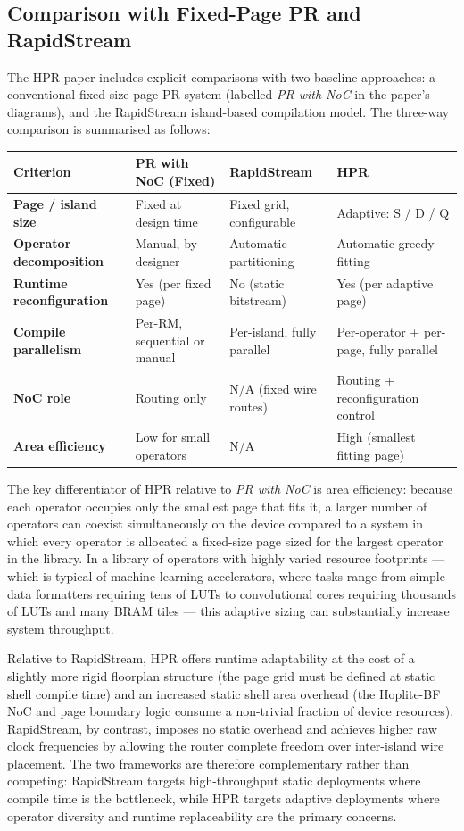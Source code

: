 \subsection{Comparison with Fixed-Page PR and RapidStream}

The HPR paper includes explicit comparisons with two baseline approaches: a conventional fixed-size page PR system (labelled \textit{PR with NoC} in the paper's diagrams), and the RapidStream island-based compilation model. The three-way comparison is summarised as follows:

\begin{table}[htbp]
\centering
\begin{tabular}{llll}
\toprule
Criterion & PR with NoC (Fixed) & RapidStream & HPR \\
\midrule
\textbf{Page / island size} & Fixed at design time & Fixed grid, configurable & Adaptive: S / D / Q \\
\textbf{Operator decomposition} & Manual, by designer & Automatic partitioning & Automatic greedy fitting \\
\textbf{Runtime reconfiguration} & Yes (per fixed page) & No (static bitstream) & Yes (per adaptive page) \\
\textbf{Compile parallelism} & Per-RM, sequential or manual & Per-island, fully parallel & Per-operator + per-page, fully parallel \\
\textbf{NoC role} & Routing only & N/A (fixed wire routes) & Routing + reconfiguration control \\
\textbf{Area efficiency} & Low for small operators & N/A & High (smallest fitting page) \\
\bottomrule
\end{tabular}
\end{table}

The key differentiator of HPR relative to \textit{PR with NoC} is area efficiency: because each operator occupies only the smallest page that fits it, a larger number of operators can coexist simultaneously on the device compared to a system in which every operator is allocated a fixed-size page sized for the largest operator in the library. In a library of operators with highly varied resource footprints — which is typical of machine learning accelerators, where tasks range from simple data formatters requiring tens of LUTs to convolutional cores requiring thousands of LUTs and many BRAM tiles — this adaptive sizing can substantially increase system throughput.

Relative to RapidStream, HPR offers runtime adaptability at the cost of a slightly more rigid floorplan structure (the page grid must be defined at static shell compile time) and an increased static shell area overhead (the Hoplite-BF NoC and page boundary logic consume a non-trivial fraction of device resources). RapidStream, by contrast, imposes no static overhead and achieves higher raw clock frequencies by allowing the router complete freedom over inter-island wire placement. The two frameworks are therefore complementary rather than competing: RapidStream targets high-throughput static deployments where compile time is the bottleneck, while HPR targets adaptive deployments where operator diversity and runtime replaceability are the primary concerns.

